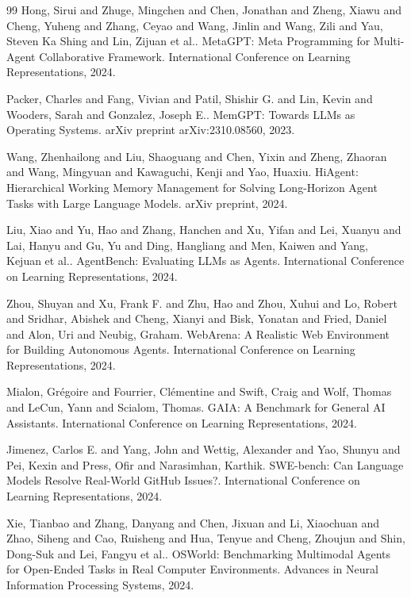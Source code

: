 \documentclass[11pt,a4paper]{article}
\begin{document}
\begin{thebibliography}{99}
Hong, Sirui and Zhuge, Mingchen and Chen, Jonathan and Zheng, Xiawu and Cheng, Yuheng and Zhang, Ceyao and Wang, Jinlin and Wang, Zili and Yau, Steven Ka Shing and Lin, Zijuan et al..
\newblock MetaGPT: Meta Programming for Multi-Agent Collaborative Framework.
\newblock International Conference on Learning Representations, 2024.

Packer, Charles and Fang, Vivian and Patil, Shishir G. and Lin, Kevin and Wooders, Sarah and Gonzalez, Joseph E..
\newblock MemGPT: Towards LLMs as Operating Systems.
\newblock arXiv preprint arXiv:2310.08560, 2023.

Wang, Zhenhailong and Liu, Shaoguang and Chen, Yixin and Zheng, Zhaoran and Wang, Mingyuan and Kawaguchi, Kenji and Yao, Huaxiu.
\newblock HiAgent: Hierarchical Working Memory Management for Solving Long-Horizon Agent Tasks with Large Language Models.
\newblock arXiv preprint, 2024.

Liu, Xiao and Yu, Hao and Zhang, Hanchen and Xu, Yifan and Lei, Xuanyu and Lai, Hanyu and Gu, Yu and Ding, Hangliang and Men, Kaiwen and Yang, Kejuan et al..
\newblock AgentBench: Evaluating LLMs as Agents.
\newblock International Conference on Learning Representations, 2024.

Zhou, Shuyan and Xu, Frank F. and Zhu, Hao and Zhou, Xuhui and Lo, Robert and Sridhar, Abishek and Cheng, Xianyi and Bisk, Yonatan and Fried, Daniel and Alon, Uri and Neubig, Graham.
\newblock WebArena: A Realistic Web Environment for Building Autonomous Agents.
\newblock International Conference on Learning Representations, 2024.

Mialon, Gr{\'e}goire and Fourrier, Cl{\'e}mentine and Swift, Craig and Wolf, Thomas and LeCun, Yann and Scialom, Thomas.
\newblock GAIA: A Benchmark for General AI Assistants.
\newblock International Conference on Learning Representations, 2024.

Jimenez, Carlos E. and Yang, John and Wettig, Alexander and Yao, Shunyu and Pei, Kexin and Press, Ofir and Narasimhan, Karthik.
\newblock SWE-bench: Can Language Models Resolve Real-World GitHub Issues?.
\newblock International Conference on Learning Representations, 2024.

Xie, Tianbao and Zhang, Danyang and Chen, Jixuan and Li, Xiaochuan and Zhao, Siheng and Cao, Ruisheng and Hua, Tenyue and Cheng, Zhoujun and Shin, Dong-Suk and Lei, Fangyu et al..
\newblock OSWorld: Benchmarking Multimodal Agents for Open-Ended Tasks in Real Computer Environments.
\newblock Advances in Neural Information Processing Systems, 2024.


\end{thebibliography}
\end{document}
